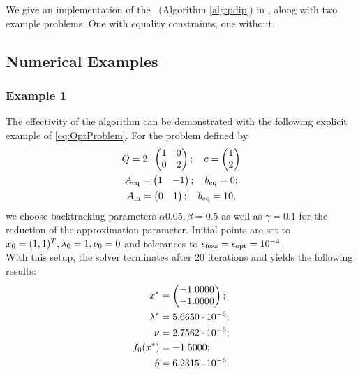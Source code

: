We give an implementation of the \pdm \ (Algorithm \ref{alg:pdip}) in \matlab, along with two example problems. One with equality constraints, one without.

\subsection{Numerical Examples}
\subsubsection{Example 1}
The effectivity of the algorithm can be demonstrated with the following explicit example of \eqref{eq:OptProblem}. For the problem defined by
\begin{gather*}
	Q = 2\cdot \begin{pmatrix}
	1 & 0\\ 0 & 2
\end{pmatrix}; \quad c = \begin{pmatrix} {1} \\ {2} \end{pmatrix}\\
{A}_{\mathrm{eq}}= \begin{pmatrix}
1 & -1
\end{pmatrix};\quad {b}_{\mathrm{eq}}= 0;\\
{A}_{\mathrm{{ in}}} = \begin{pmatrix}
0 & 1
\end{pmatrix}; \quad {b}_{\mathrm{eq}}= 10,
\end{gather*}
we choose backtracking parameters $ \alpha 0.05,\beta = 0.5 $ as well as $ \gamma = 0.1 $ for the reduction of the approximation parameter. Initial points are set to $ x_0 = (1,1)^T, \lambda_0 = 1, \nu_0 = 0 $ and tolerances to $ {\epsilon}_{\mathrm{feas}} = {\epsilon}_{\mathrm{opt}} = 10^{-4} $.\\

With this setup, the solver terminates after 20 iterations and yields the following results:
\begin{align*}
	x^* &= \begin{pmatrix} {-1.0000} \\ {-1.0000} \end{pmatrix};\\
	\lambda^*&= 5.6650\cdot 10^{-6};\\ \nu&= 2.7562\cdot 10^{-6};\\
	f_0(x^*) &= -1.5000;\\ \hat{\eta}&= 6.2315\cdot 10^{-6}.
\end{align*}





